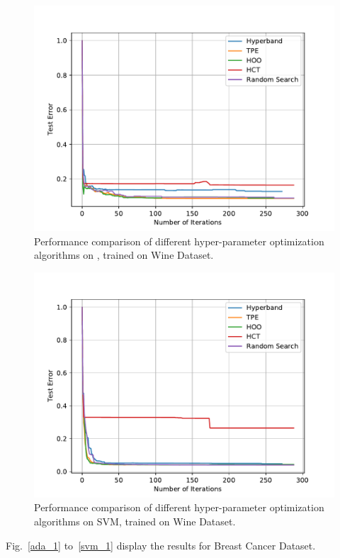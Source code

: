 \documentclass[twoside,11pt]{article}
\begin{document}
\begin{figure}[ht]
    \centering
    \includegraphics[scale=0.8]{img/uci/sk_mlp_0.pdf}
    \caption{Performance comparison of different hyper-parameter optimization algorithms on \MLP, trained on Wine Dataset.}
    \label{sk_mlp_0}
\end{figure}

\begin{figure}[ht]
    \centering
    \includegraphics[scale=0.8]{img/uci/svm_0.pdf}
    \caption{Performance comparison of different hyper-parameter optimization algorithms on SVM, trained on Wine Dataset.}
    \label{svm_0}
\end{figure}

Fig.~\ref{ada_1} to~\ref{svm_1} display the results for Breast Cancer Dataset.
\end{document}
